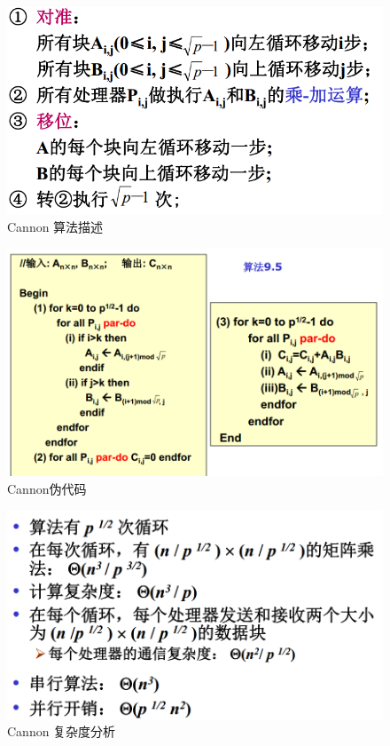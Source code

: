\documentclass[UTF8,a4paper]{ctexart}
\begin{document}
\begin{figure}[H]
  \centering
  \includegraphics[scale = 0.3]{assets/ParallelComputing_e6eb5.png}
  \caption{Cannon 算法描述}
\end{figure}
\begin{figure}[H]
  \centering
  \includegraphics[scale = 0.3]{assets/ParallelComputing_962bf.png}
  \caption{Cannon伪代码}
\end{figure}
\begin{figure}[H]
  \centering
  \includegraphics[scale = 0.3]{assets/ParallelComputing_df3c9.png}
  \caption{Cannon 复杂度分析}
\end{figure}
\end{document}
